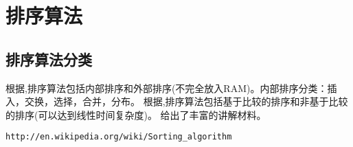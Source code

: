 
\section{排序算法}

\subsection{排序算法分类}
\label{subsec:sortAthmClass}

根据\cite{acp},排序算法包括内部排序和外部排序(不完全放入RAM)。内部排序分类：插入，交换，选择，合并，分布。
根据\cite{ita},排序算法包括基于比较的排序和非基于比较的排序(可以达到线性时间复杂度)。
\cite{weijipedia}给出了丰富的讲解材料。
\begin{verbatim}
http://en.wikipedia.org/wiki/Sorting_algorithm
\end{verbatim}

